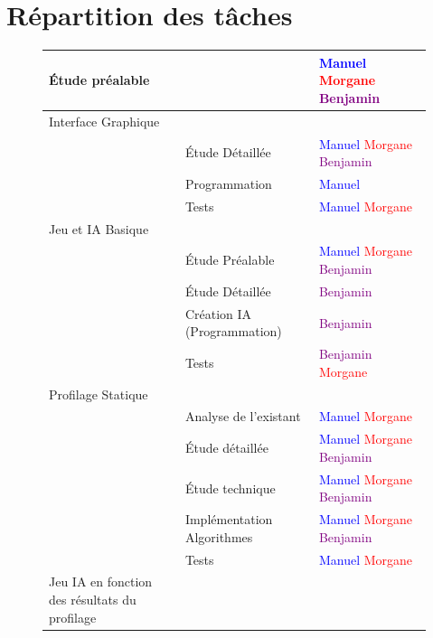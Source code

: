 \documentclass{report}
\begin{document}
\section{Répartition des tâches}

		\begin{figure}[h]
			\hspace{-1.5cm}	\begin{tabular}{|l|l|l|}
				\hline
				Étude préalable & & \textcolor{blue}{Manuel}  \textcolor{red}{Morgane}  \textcolor{purple}{Benjamin}\\ 
				\hline
  				 Interface Graphique & &  \\
  				 \hline
  				 & Étude Détaillée &  \textcolor{blue}{Manuel}  \textcolor{red}{Morgane}  \textcolor{purple}{Benjamin}\\
  				 \hline
  				 & Programmation & \textcolor{blue}{Manuel}\\
  				 \hline
  				 & Tests & \textcolor{blue}{Manuel}  \textcolor{red}{Morgane}\\
  				 \hline
  				 Jeu et IA Basique & & \\
  				 \hline
  				 & Étude Préalable & \textcolor{blue}{Manuel}  \textcolor{red}{Morgane}  \textcolor{purple}{Benjamin}\\
  				 \hline
  				 & Étude Détaillée & \textcolor{purple}{Benjamin}\\
  				 \hline
  				 & Création IA (Programmation) & \textcolor{purple}{Benjamin}\\
  				 \hline
  				 & Tests & \textcolor{purple}{Benjamin} \textcolor{red}{Morgane}\\
  				 \hline
  				 Profilage Statique & &\\
  				 \hline
  				 & Analyse de l'existant & \textcolor{blue}{Manuel}  \textcolor{red}{Morgane} \\
  				 \hline
  				 & Étude détaillée & \textcolor{blue}{Manuel}  \textcolor{red}{Morgane}  \textcolor{purple}{Benjamin}\\
  				 \hline
  				 & Étude technique & \textcolor{blue}{Manuel}  \textcolor{red}{Morgane}  \textcolor{purple}{Benjamin}\\
  				 \hline
  				 & Implémentation Algorithmes & \textcolor{blue}{Manuel}  \textcolor{red}{Morgane}  \textcolor{purple}{Benjamin}\\
  				 \hline
  				 & Tests & \textcolor{blue}{Manuel}  \textcolor{red}{Morgane} \\
  				 \hline
  				 Jeu IA en fonction des résultats du profilage & &\\

\end{tabular}
\end{figure}
\end{document}
